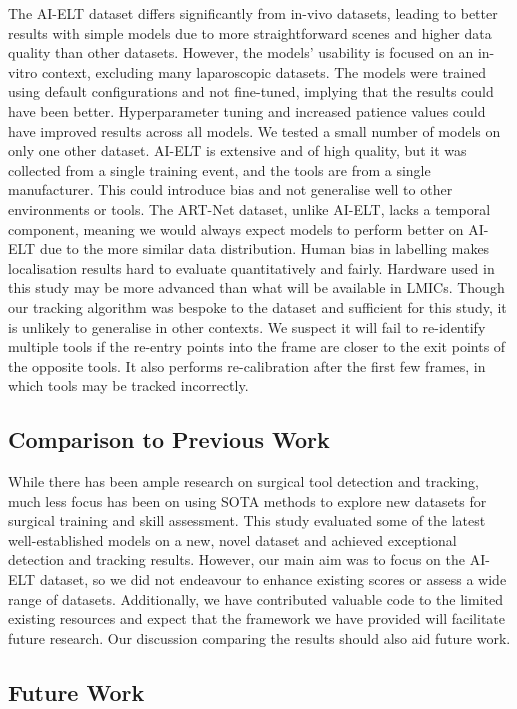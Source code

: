 The AI-ELT dataset differs significantly from in-vivo datasets, leading to better results with simple models due to more straightforward scenes and higher data quality than other datasets. However, the models' usability is focused on an in-vitro context, excluding many laparoscopic datasets. The models were trained using default configurations and not fine-tuned, implying that the results could have been better. Hyperparameter tuning and increased patience values could have improved results across all models. We tested a small number of models on only one other dataset. AI-ELT is extensive and of high quality, but it was collected from a single training event, and the tools are from a single manufacturer. This could introduce bias and not generalise well to other environments or tools. The ART-Net dataset, unlike AI-ELT, lacks a temporal component, meaning we would always expect models to perform better on AI-ELT due to the more similar data distribution. Human bias in labelling makes localisation results hard to evaluate quantitatively and fairly. Hardware used in this study may be more advanced than what will be available in LMICs. Though our tracking algorithm was bespoke to the dataset and sufficient for this study, it is unlikely to generalise in other contexts. We suspect it will fail to re-identify multiple tools if the re-entry points into the frame are closer to the exit points of the opposite tools. It also performs re-calibration after the first few frames, in which tools may be tracked incorrectly.

\subsection{Comparison to Previous Work}

While there has been ample research on surgical tool detection and tracking, much less focus has been on using SOTA methods to explore new datasets for surgical training and skill assessment. This study evaluated some of the latest well-established models on a new, novel dataset and achieved exceptional detection and tracking results. However, our main aim was to focus on the AI-ELT dataset, so we did not endeavour to enhance existing scores or assess a wide range of datasets. Additionally, we have contributed valuable code to the limited existing resources and expect that the framework we have provided will facilitate future research. Our discussion comparing the results should also aid future work.

\subsection{Future Work}

